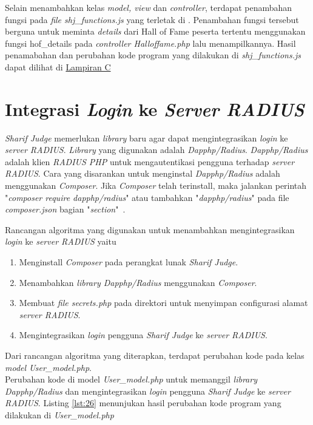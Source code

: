Selain menambahkan kelas \textit{model, view} dan \textit{controller}, terdapat penambahan fungsi pada \textit{file shj\_functions.js} yang terletak di . Penambahan fungsi tersebut berguna untuk meminta \textit{details} dari Hall of Fame peserta tertentu menggunakan fungsi hof\_details pada \textit{controller Halloffame.php} lalu menampilkannya. Hasil penamabahan dan perubahan kode program yang dilakukan di \textit{shj\_functions.js} dapat dilihat di \hyperref[lamp:kodeprogramshjfunc]{Lampiran C}

\section{Integrasi \textit{Login} ke \textit{Server RADIUS}}
\textit{Sharif Judge} memerlukan \textit{library} baru agar dapat mengintegrasikan \textit{login} ke \textit{server RADIUS}. \textit{Library} yang digunakan adalah \textit{Dapphp/Radius}. \textit{Dapphp/Radius} adalah klien \textit{RADIUS PHP} untuk mengautentikasi pengguna terhadap \textit{server RADIUS}. Cara yang disarankan untuk menginstal \textit{Dapphp/Radius} adalah menggunakan \textit{Composer}. Jika \textit{Composer} telah terinstall, maka jalankan perintah "\textit{composer require dapphp/radius}" atau tambahkan "\textit{dapphp/radius}" pada file \textit{composer.json} bagian "\textit{section}"~\cite{drew:16:radius}.

Rancangan algoritma yang digunakan untuk menambahkan mengintegrasikan \textit{login} ke \textit{server RADIUS} yaitu
\begin{enumerate}
	\item Menginstall \textit{Composer} pada perangkat lunak \textit{Sharif Judge}.
	\item Menambahkan \textit{library Dapphp/Radius} menggunakan \textit{Composer}.
	\item Membuat \textit{file secrets.php} pada direktori  untuk menyimpan configurasi alamat \textit{server RADIUS}.
	\item Mengintegrasikan \textit{login} pengguna \textit{Sharif Judge} ke \textit{server RADIUS}.
\end{enumerate}

Dari rancangan algoritma yang diterapkan, terdapat perubahan kode pada kelas \textit{model User\_model.php}.
~\\
Perubahan kode di model \textit{User\_model.php} untuk memanggil \textit{library Dapphp/Radius} dan mengintegrasikan \textit{login} pengguna \textit{Sharif Judge} ke \textit{server RADIUS}. Listing \ref{lst:26} menunjukan hasil perubahan kode program yang dilakukan di \textit{User\_model.php}

